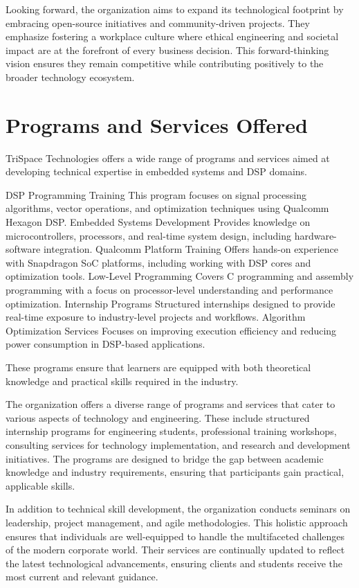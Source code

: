 \documentclass[12pt,a4paper]{report}
\begin{document}
Looking forward, the organization aims to expand its technological footprint by embracing open-source initiatives and community-driven projects. They emphasize fostering a workplace culture where ethical engineering and societal impact are at the forefront of every business decision. This forward-thinking vision ensures they remain competitive while contributing positively to the broader technology ecosystem.


\section{Programs and Services Offered}

TriSpace Technologies offers a wide range of programs and services aimed at developing technical expertise in embedded systems and DSP domains.


DSP Programming Training This program focuses on signal processing algorithms, vector operations, and optimization techniques using Qualcomm Hexagon DSP. Embedded Systems Development Provides knowledge on microcontrollers, processors, and real-time system design, including hardware-software integration. Qualcomm Platform Training Offers hands-on experience with Snapdragon SoC platforms, including working with DSP cores and optimization tools. Low-Level Programming Covers C programming and assembly programming with a focus on processor-level understanding and performance optimization. Internship Programs Structured internships designed to provide real-time exposure to industry-level projects and workflows. Algorithm Optimization Services Focuses on improving execution efficiency and reducing power consumption in DSP-based applications.


These programs ensure that learners are equipped with both theoretical knowledge and practical skills required in the industry.


The organization offers a diverse range of programs and services that cater to various aspects of technology and engineering. These include structured internship programs for engineering students, professional training workshops, consulting services for technology implementation, and research and development initiatives. The programs are designed to bridge the gap between academic knowledge and industry requirements, ensuring that participants gain practical, applicable skills.


In addition to technical skill development, the organization conducts seminars on leadership, project management, and agile methodologies. This holistic approach ensures that individuals are well-equipped to handle the multifaceted challenges of the modern corporate world. Their services are continually updated to reflect the latest technological advancements, ensuring clients and students receive the most current and relevant guidance.
\end{document}
